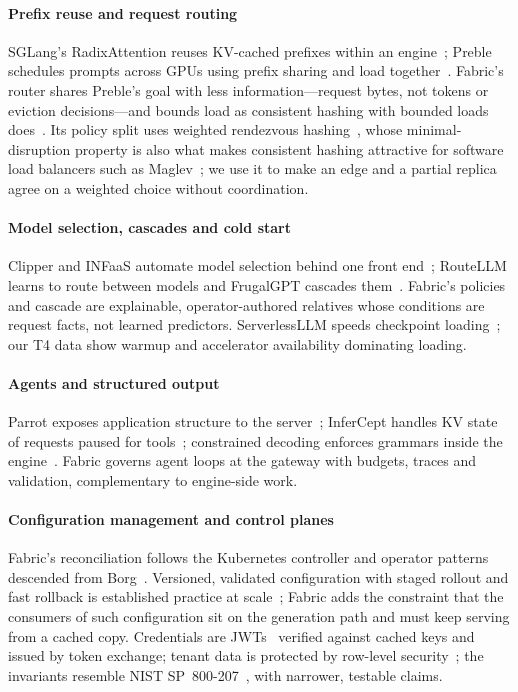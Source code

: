 \documentclass[conference,letterpaper]{IEEEtran}
\newcommand{\sys}{Fabric}
\begin{document}
\paragraph*{Prefix reuse and request routing}
SGLang's RadixAttention reuses KV-cached prefixes within an engine~\cite{sglang}; Preble
schedules prompts across GPUs using prefix sharing and load together~\cite{preble}. \sys{}'s
router shares Preble's goal with less information---request bytes, not tokens or eviction
decisions---and bounds load as consistent hashing with bounded loads does~\cite{karger,
boundedloads}. Its policy split uses weighted rendezvous hashing~\cite{rendezvous,weighteddht},
whose minimal-disruption property is also what makes consistent hashing attractive for software
load balancers such as Maglev~\cite{maglev}; we use it to make an edge and a partial replica agree
on a weighted choice without coordination.

\paragraph*{Model selection, cascades and cold start}
Clipper and INFaaS automate model selection behind one front end~\cite{clipper,infaas};
RouteLLM learns to route between models and FrugalGPT cascades them~\cite{routellm,frugalgpt}.
\sys{}'s policies and cascade are explainable, operator-authored relatives whose conditions are
request facts, not learned predictors. ServerlessLLM speeds checkpoint loading~\cite{serverlessllm};
our T4 data show warmup and accelerator availability dominating loading.

\paragraph*{Agents and structured output}
Parrot exposes application structure to the
server~\cite{parrot}; InferCept handles KV state of requests paused for tools~\cite{infercept};
constrained decoding enforces grammars inside the engine~\cite{outlines}. \sys{} governs agent
loops at the gateway with budgets, traces and validation, complementary to engine-side work.

\paragraph*{Configuration management and control planes}
\sys{}'s reconciliation follows the Kubernetes controller and operator
patterns~\cite{k8scontroller,borgomegak8s} descended from Borg~\cite{borg}. Versioned,
validated configuration with staged rollout and fast rollback is established practice at
scale~\cite{fbconfig}; \sys{} adds the constraint that the consumers of such configuration sit on
the generation path and must keep serving from a cached copy. Credentials are
JWTs~\cite{rfc7519} verified against cached keys and issued by token
exchange; tenant data is protected by row-level security~\cite{pgrls}; the
invariants resemble NIST SP~800-207~\cite{nistzt}, with narrower, testable claims.
\end{document}
